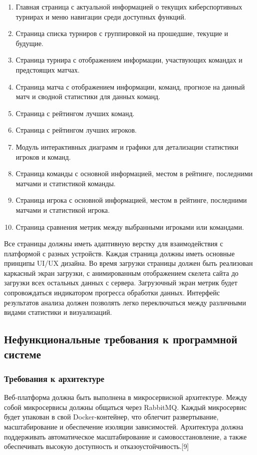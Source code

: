 \begin{enumerate}
	\item Главная страница с актуальной информацией о текущих киберспортивных турнирах и меню навигации среди доступных функций.
	\item Страница списка турниров с группировкой на прошедшие, текущие и будущие.
	\item Страница турнира с отображением информации, участвующих командах и предстоящих матчах.
	\item Страница матча с отображением информации, команд, прогнозе на данный матч и сводной статистики для данных команд.
	\item Страница с рейтингом лучших команд.
	\item Страница с рейтингом лучших игроков.
	\item Модуль интерактивных диаграмм и графики для детализации статистики игроков и команд.
	\item Страница команды с основной информацией, местом в рейтинге, последними матчами и статистикой команды.
	\item Страница игрока с основной информацией, местом в рейтинге, последними матчами и статистикой игрока.
	\item Страница сравнения метрик между выбранными игроками или командами.
\end{enumerate}

Все страницы должны иметь адаптивную верстку для взаимодействия с платформой с разных устройств. Каждая страница должны иметь основные принципы UI/UX дизайна.
Во время загрузки страницы должен быть реализован каркасный экран загрузки, с анимированным отображением скелета сайта до загрузки всех остальных данных с сервера. Загрузочный экран метрик будет сопровождаться индикатором прогресса обработки данных. Интерфейс результатов анализа должен позволять легко переключаться между различными видами статистики и визуализаций.

\subsection{Нефункциональные требования к программной системе}
\subsubsection{Требования к архитектуре}
Веб-платформа должна быть выполнена в микросервисной архитектуре. Между собой микросервисы должны общаться через RabbitMQ. Каждый микросервис будет упакован в свой Docker-контейнер, что облегчит развертывание, масштабирование и обеспечение изоляции зависимостей. Архитектура должна поддерживать автоматическое масштабирование и самовосстановление, а также обеспечивать высокую доступность и отказоустойчивость.[9]

